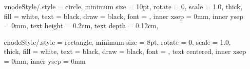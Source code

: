 \tikzset
{
vnodeStyle/.style =
{
circle,                                 %
minimum size    = 10pt,                %
rotate          = 0,                    %
scale           = 1.0,                  %
thick,                                  %
%
fill            = white,             %
text            = black,                %
draw            = black,                %
%
font            = \scriptsize,              %
inner xsep      = 0mm,                  %
inner ysep      = 0mm,                  %
text height     = 0.2cm,
text depth      = 0.12cm,
}
}


\tikzset
{
cnodeStyle/.style =
{
rectangle,                                  %
minimum size    = 8pt,                %
rotate          = 0,                    %
scale           = 1.0,                  %
thick,                                  %
%
fill            = white,             %
text            = black,                %
draw            = black,                %
%
font            = \scriptsize,              %
text centered,                          %
inner xsep      = 0mm,                  %
inner ysep      = 0mm                   %
}
}


